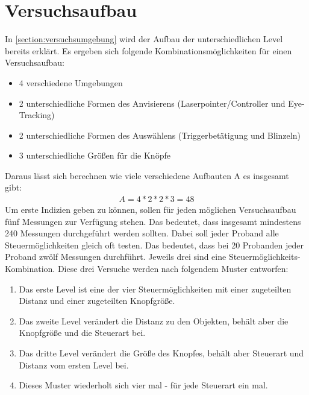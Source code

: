 \section{Versuchsaufbau} 
In \autoref{section:versuchsumgebung} wird der Aufbau der unterschiedlichen Level bereits erklärt. Es ergeben sich folgende Kombinationsmöglichkeiten für einen Versuchsaufbau:
\begin{itemize}
	\item 4 verschiedene Umgebungen
	\item 2 unterschiedliche Formen des Anvisierens (Laserpointer/Controller und Eye-Tracking)
	\item 2 unterschiedliche Formen des Auswählens (Triggerbetätigung und Blinzeln)
	\item 3 unterschiedliche Größen für die Knöpfe
\end{itemize}
Daraus lässt sich berechnen wie viele verschiedene Aufbauten A es insgesamt gibt:
\begin{align}
	A=4*2*2*3=48
\end{align}
Um erste Indizien geben zu können, sollen für jeden möglichen Versuchsaufbau fünf Messungen zur Verfügung stehen. Das bedeutet, dass insgesamt mindestens 240 Messungen durchgeführt werden sollten. Dabei soll jeder Proband alle Steuermöglichkeiten gleich oft testen. Das bedeutet, dass bei 20 Probanden jeder Proband zwölf Messungen durchführt. Jeweils drei sind eine Steuermöglichkeits-Kombination. Diese drei Versuche werden nach folgendem Muster entworfen:
\begin{enumerate}
	\item Das erste Level ist eine der vier Steuermöglichkeiten mit einer zugeteilten Distanz und einer zugeteilten Knopfgröße.
	\item Das zweite Level verändert die Distanz zu den Objekten, behält aber die Knopfgröße und die Steuerart bei.
	\item Das dritte Level verändert die Größe des Knopfes, behält aber Steuerart und Distanz vom ersten Level bei.
	\item Dieses Muster wiederholt sich vier mal - für jede Steuerart ein mal.
\end{enumerate}

